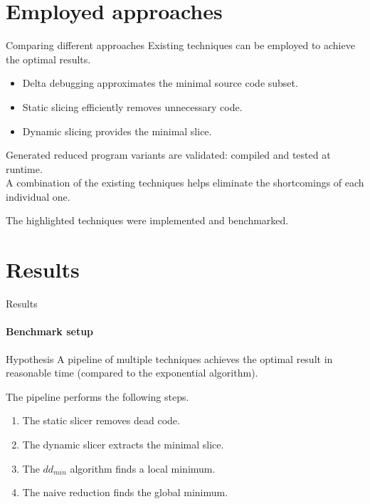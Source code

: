 \documentclass{beamer}
\begin{document}
\section{Employed approaches}

    \begin{frame}{Comparing different approaches}
      Existing techniques can be employed to achieve the optimal results.\\
      \begin{itemize}
          \item \alert{Delta debugging} approximates the minimal source code subset.\\
          \item \alert{Static slicing} efficiently removes unnecessary code.\\
          \item \alert{Dynamic slicing} provides the minimal slice.\\
      \end{itemize}
    
      \bigskip
      Generated reduced program variants are \alert{validated}: compiled and tested at runtime.\\
      \bigskip
      A combination of the existing techniques helps eliminate the shortcomings of each individual one.\\
      \bigskip
      
      The highlighted techniques were implemented and benchmarked.
    \end{frame}


\section{Results}

    \begin{frame}{Results}
      \framesubtitle{Benchmark setup}
      
      \begin{block}{Hypothesis}
        A pipeline of multiple techniques achieves the optimal result in reasonable time (compared to the exponential algorithm).
      \end{block}
      
      The pipeline performs the following steps.
      
      \begin{enumerate}
          \item The \alert{static slicer} removes dead code.\\
          \item The \alert{dynamic slicer} extracts the minimal slice.\\
          \item The \alert{$dd_{min}$ algorithm} finds a local minimum.\\
          \item The \alert{naive reduction} finds the global minimum.\\
      \end{enumerate}
      
    \end{frame}
\end{document}
